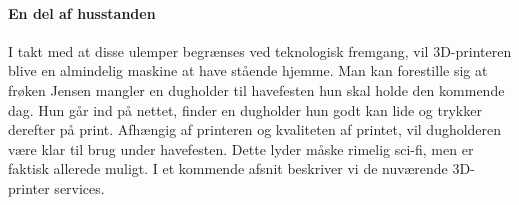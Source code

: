 
\paragraph{En del af husstanden} %
\label{par:en_del_af_husstanden}


I takt med at disse ulemper begrænses ved teknologisk fremgang, vil 3D-printeren blive en almindelig maskine at have stående hjemme. Man kan forestille sig at frøken Jensen mangler en dugholder til havefesten hun skal holde den kommende dag. Hun går ind på nettet, finder en dugholder hun godt kan lide og trykker derefter på print. Afhængig af printeren og kvaliteten af printet, vil dugholderen være klar til brug under havefesten. Dette lyder måske rimelig sci-fi, men er faktisk allerede muligt. I et kommende afsnit beskriver vi de nuværende 3D-printer services.

